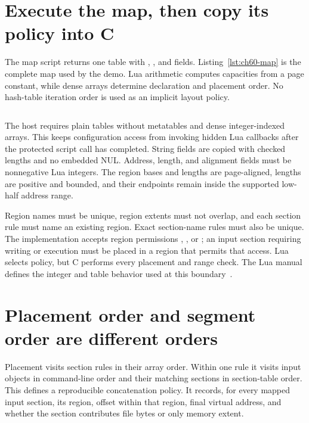 \section{Execute the map, then copy its policy into C}
\label{sec:ch60-map}

The map script returns one table with , , and  fields.
Listing~\ref{lst:ch60-map} is the complete map used by the demo.
Lua arithmetic computes capacities from a page constant, while dense arrays determine declaration and placement order.
No hash-table iteration order is used as an implicit layout policy.

\begin{listing}[htbp]
\inputminted{lua}{example-code/lua-toolchain/map.lua}
\caption{The Lua map supplies explicit region boundaries and an ordered exact-name placement policy.}
\label{lst:ch60-map}
\end{listing}

The host requires plain tables without metatables and dense integer-indexed arrays.
This keeps configuration access from invoking hidden Lua callbacks after the protected script call has completed.
String fields are copied with checked lengths and no embedded NUL.
Address, length, and alignment fields must be nonnegative Lua integers.
The region bases and lengths are page-aligned, lengths are positive and bounded, and their endpoints remain inside the supported low-half address range.

Region names must be unique, region extents must not overlap, and each section rule must name an existing region.
Exact section-name rules must also be unique.
The implementation accepts region permissions , , or ; an input section requiring writing or execution must be placed in a region that permits that access.
Lua selects policy, but C performs every placement and range check.
The Lua manual defines the integer and table behavior used at this boundary~\cite{ierusalimschy-2026-lua}.

\section{Placement order and segment order are different orders}
\label{sec:ch60-order}

Placement visits section rules in their array order.
Within one rule it visits input objects in command-line order and their matching sections in section-table order.
This defines a reproducible concatenation policy.
It records, for every mapped input section, its region, offset within that region, final virtual address, and whether the section contributes file bytes or only memory extent.

